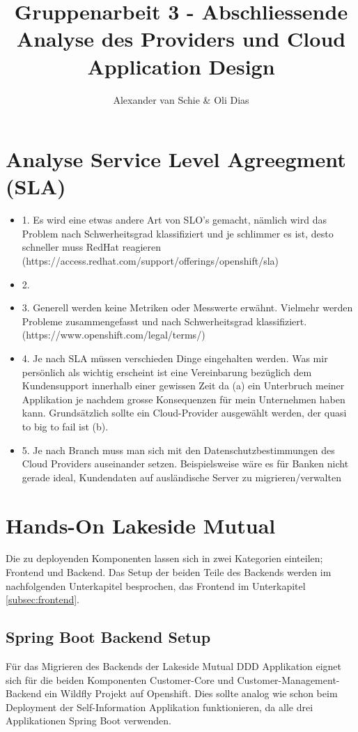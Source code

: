 \documentclass[12pt,a4paper]{article}
\author{Alexander van Schie \& Oli Dias}
\title{Gruppenarbeit 3 - Abschliessende Analyse des Providers und Cloud Application Design}
\begin{document}
\maketitle
\newpage
\tableofcontents
\newpage
\section{Analyse Service Level Agreegment (SLA)}
\begin{itemize}
    \item 1. Es wird eine etwas andere Art von SLO’s gemacht, nämlich wird das Problem nach Schwerheitsgrad klassifiziert und je schlimmer es ist, desto schneller muss RedHat reagieren (https://access.redhat.com/support/offerings/openshift/sla)
    \item 2.
    \item 3. Generell werden keine Metriken oder Messwerte erwähnt. Vielmehr werden Probleme zusammengefasst und nach Schwerheitsgrad klassifiziert. (https://www.openshift.com/legal/terms/)
    \item 4. Je nach SLA müssen verschieden Dinge eingehalten werden. Was mir persönlich als wichtig erscheint ist eine Vereinbarung bezüglich dem Kundensupport innerhalb einer gewissen Zeit da (a) ein Unterbruch meiner Applikation je nachdem grosse Konsequenzen für mein Unternehmen haben kann. Grundsätzlich sollte ein Cloud-Provider ausgewählt werden, der quasi to big to fail ist (b).
    \item 5. Je nach Branch muss man sich mit den Datenschutzbestimmungen des Cloud Providers auseinander setzen. Beispielsweise wäre es für Banken nicht gerade ideal, Kundendaten auf ausländische Server zu migrieren/verwalten
\end{itemize}

\section{Hands-On Lakeside Mutual}
Die zu deployenden Komponenten lassen sich in zwei Kategorien einteilen; Frontend und Backend. Das Setup der beiden Teile des Backends werden im nachfolgenden Unterkapitel besprochen, das Frontend im Unterkapitel \ref{subsec:frontend}. 

\subsection{Spring Boot Backend Setup}
Für das Migrieren des Backends der Lakeside Mutual DDD Applikation eignet sich für die beiden Komponenten Customer-Core und Customer-Management-Backend ein Wildfly Projekt auf Openshift. Dies sollte analog wie schon beim Deployment der Self-Information Applikation funktionieren, da alle drei Applikationen Spring Boot verwenden. 
\end{document}
